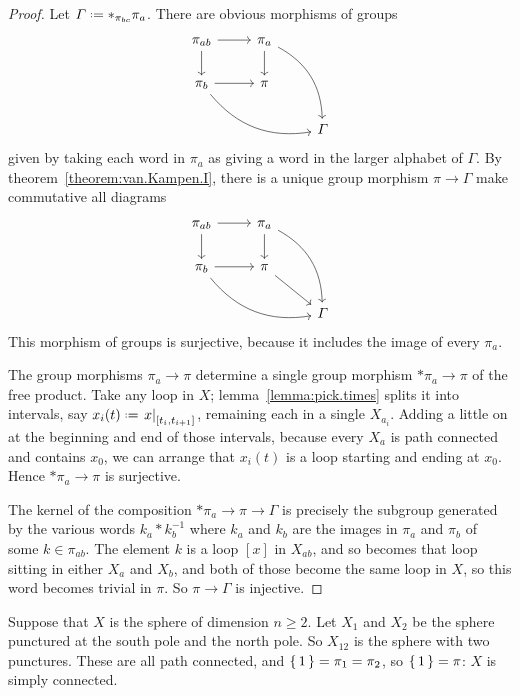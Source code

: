 \begin{proof}
Let \(\Gamma\defeq *_{\pi_{bc}} \pi_a\).
There are obvious morphisms of groups
\[
\begin{tikzcd}
\pi_{ab} \arrow{r}{} \arrow{d}{} & \pi_a \arrow{d}{} \arrow[bend left]{rdd} \\
\pi_b \arrow{r}{} \arrow[bend right]{rrd}
& \pi \\
& & \Gamma
\end{tikzcd}
\]
given by taking each word in \(\pi_a\) as giving a word in the larger alphabet of \(\Gamma\).
By theorem~\vref{theorem:van.Kampen.I}, there is a unique group morphism \(\pi \to \Gamma\) make commutative all diagrams
\[
\begin{tikzcd}
\pi_{ab} \arrow{r}{} \arrow{d}{} & \pi_a \arrow{d}{} \arrow[bend left]{rdd} \\
\pi_b \arrow{r}{} \arrow[bend right]{rrd}
& \pi \arrow{rd}{} \\
& & \Gamma 
\end{tikzcd}
\]
This morphism of groups is surjective, because it includes the image of every \(\pi_a\).

The group morphisms \(\pi_a \to \pi\) determine a single group morphism \(*\pi_a \to \pi\) of the free product.
Take any loop in \(X\); lemma~\vref{lemma:pick.times} splits it into intervals, say \(x_i(t)\defeq\left.x\right|_{[t_i,t_{i+1}]}\),  remaining each in a single \(X_{a_i}\).
Adding a little on at the beginning and end of those intervals, because every \(X_a\) is path connected and contains \(x_0\), we can arrange that \(x_i(t)\) is a loop starting and ending at \(x_0\).
Hence \(*\pi_a \to \pi\) is surjective.

The kernel of the composition \(* \pi_a \to \pi \to \Gamma\) is precisely the subgroup generated by the various words 
\(k_a * k_b^{-1}\) where \(k_a\) and \(k_b\) are the images in \(\pi_a\) and \(\pi_b\) of some \(k \in \pi_{ab}\).
The element \(k\) is a loop \([x]\) in \(X_{ab}\), and so becomes that loop sitting in either \(X_a\) and \(X_b\), and both of those become the same loop in \(X\), so this word becomes trivial in \(\pi\).
So \(\pi \to \Gamma\) is injective.
\end{proof}
\begin{example}
Suppose that \(X\) is the sphere of dimension \(n \ge 2\).
Let \(X_1\) and \(X_2\) be the sphere punctured at the south pole and the north pole.
So \(X_{12}\) is the sphere with two punctures.
These are all path connected, and \(\set{1}=\pi_1=\pi_2\), so \(\set{1}=\pi\): \(X\) is simply connected.
\end{example}
